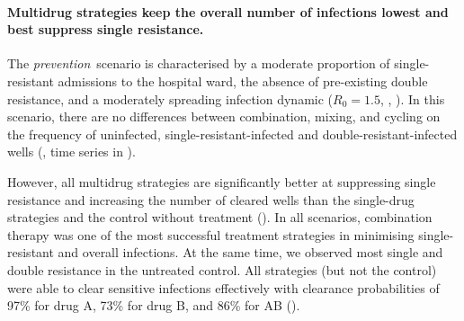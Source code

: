 \paragraph{Multidrug strategies keep the overall number of infections lowest and best suppress single resistance.}
The \textit{prevention}~scenario is characterised by a moderate proportion of single-resistant admissions to the hospital ward, the absence of pre-existing double resistance, and a moderately spreading infection dynamic ($R_0 = 1.5$, ,  ).
In this scenario, there are no differences between combination, mixing, and cycling on the frequency of uninfected, single-resistant-infected and double-resistant-infected wells (, time series in ).

However, all multidrug strategies are significantly better at suppressing single resistance and increasing the number of cleared wells than the single-drug strategies and the control without treatment ().
In all scenarios, combination therapy was one of the most successful treatment strategies in minimising single-resistant and overall infections.
At the same time, we observed most single and double resistance in the untreated control.
All strategies (but not the control) were able to clear sensitive infections effectively with clearance probabilities of 97\% for drug A, 73\% for drug B, and 86\% for AB ().


